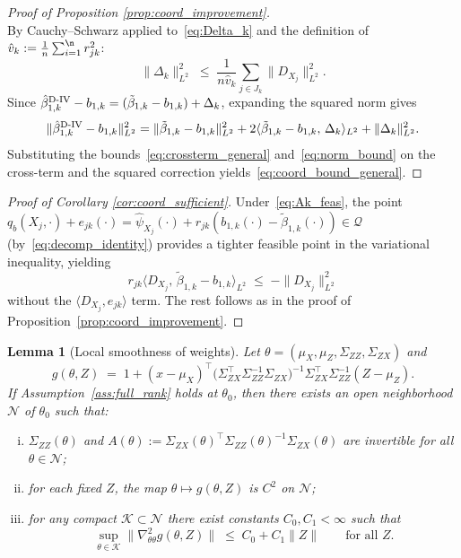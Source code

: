 \documentclass[12pt]{article}
\newcommand{\est}{\ensuremath{\textnormal{D-IV}}\xspace}
\newtheorem{lemma}{Lemma}
\begin{document}
\begin{proof}[Proof of Proposition \ref{prop:coord_improvement}]
\begin{equation}
\end{equation}
By Cauchy--Schwarz applied to~\eqref{eq:Delta_k} and the definition of $\hat v_k :=  \frac1n \sum_{i=1}^\n r_{jk}^2$:
\begin{equation}\label{eq:norm_bound}
\|\Delta_k\|_{L^2}^2\;\le\;\frac{1}{n\hat v_k}\sum_{j\in J_k}\|D_{X_j}\|_{L^2}^2.
\end{equation}
Since $\hat\beta_{1,k}^{\est} - b_{1,k} = (\tilde\beta_{1,k} - b_{1,k}) + \Delta_k$, expanding the squared norm gives
\[
\|\hat\beta_{1,k}^{\est}-b_{1,k}\|_{L^2}^2
= \|\tilde\beta_{1,k}-b_{1,k}\|_{L^2}^2
+ 2\langle\tilde\beta_{1,k}-b_{1,k},\,\Delta_k\rangle_{L^2}
+ \|\Delta_k\|_{L^2}^2.
\]
Substituting the bounds~\eqref{eq:crossterm_general} and~\eqref{eq:norm_bound} on the cross-term and the squared correction yields~\eqref{eq:coord_bound_general}.
\end{proof}

\begin{proof}[Proof of Corollary \ref{cor:coord_sufficient}]
Under~\eqref{eq:Ak_feas}, the point $q_b(X_j,\cdot)+e_{jk}(\cdot)=\hat\psi_{X_j}(\cdot)+r_{jk}(b_{1,k}(\cdot)-\tilde\beta_{1,k}(\cdot))\in\mathcal Q$ (by~\eqref{eq:decomp_identity}) provides a tighter feasible point in the variational inequality, yielding
\[
r_{jk}\langle D_{X_j},\,\tilde\beta_{1,k}-b_{1,k}\rangle_{L^2}
\;\le\;
-\|D_{X_j}\|_{L^2}^2
\]
without the $\langle D_{X_j}, e_{jk}\rangle$ term. The rest follows as in the proof of Proposition~\ref{prop:coord_improvement}.
\end{proof}

\begin{lemma}[Local smoothness of weights]\label{lem:smooth_g_from_fullrank}
Let $\theta=(\mu_X,\mu_Z,\Sigma_{ZZ},\Sigma_{ZX})$ and
\[
g(\theta,Z)\;=\;1+(x-\mu_X)^{\!\top}
\Big(\Sigma_{ZX}^{\!\top}\Sigma_{ZZ}^{-1}\Sigma_{ZX}\Big)^{-1}
\Sigma_{ZX}^{\!\top}\Sigma_{ZZ}^{-1}(Z-\mu_Z).
\]
If Assumption~\ref{ass:full_rank} holds at $\theta_0$, then there exists an open neighborhood $\mathcal N$ of $\theta_0$ such that:
\begin{enumerate}[(i)]
\item $\Sigma_{ZZ}(\theta)$ and $A(\theta):=\Sigma_{ZX}(\theta)^{\!\top}\Sigma_{ZZ}(\theta)^{-1}\Sigma_{ZX}(\theta)$ are invertible for all $\theta\in\mathcal N$;
\item for each fixed $Z$, the map $\theta\mapsto g(\theta,Z)$ is $C^2$ on $\mathcal N$;
\item for any compact $\mathcal K\subset\mathcal N$ there exist constants $C_0,C_1<\infty$ such that
\[
\sup_{\theta\in\mathcal K}\big\|\nabla^2_{\theta\theta} g(\theta,Z)\big\|
\;\le\; C_0+C_1\|Z\|\qquad\text{for all $Z$.}
\]
\end{enumerate}
\end{lemma}
\end{document}
